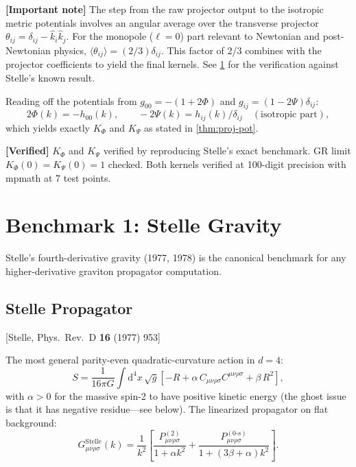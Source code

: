 \documentclass[11pt,a4paper]{article}
\theoremstyle{plain}
\theoremstyle{definition}
\theoremstyle{remark}
\newcommand{\Rsq}{R^2}
\newcommand{\Weylsq}{C_{\mu\nu\rho\sigma}C^{\mu\nu\rho\sigma}}
\renewcommand{\dd}{\mathrm{d}}
\newcommand{\fromlit}[1]{\textcolor{blue!70!black}{\textsf{[#1]}}}
\newcommand{\verified}[1]{%
  \par\smallskip\noindent
  \colorbox{green!10}{\parbox{\dimexpr\linewidth-2\fboxsep}{%
    \textcolor{green!50!black}{\textbf{[Verified]}} #1}}%
  \par\smallskip}
\newcommand{\signcorrection}[1]{%
  \par\smallskip\noindent
  \colorbox{red!10}{\parbox{\dimexpr\linewidth-2\fboxsep}{%
    \textcolor{red!60!black}{\textbf{[Important note]}} #1}}%
  \par\smallskip}
\begin{document}
\signcorrection{The step from the raw projector output to the
isotropic metric potentials involves an angular average over the
transverse projector $\theta_{ij} = \delta_{ij} - \hat{k}_i\hat{k}_j$.
For the monopole ($\ell = 0$) part relevant to Newtonian and
post-Newtonian physics, $\langle\theta_{ij}\rangle
= (2/3)\delta_{ij}$.  This factor of 2/3 combines with the
projector coefficients to yield the final kernels.  See
\cref{sec:stelle-check} for the verification against Stelle's
known result.}

Reading off the potentials from
$g_{00} = -(1 + 2\Phi)$ and $g_{ij} = (1 - 2\Psi)\delta_{ij}$:
\begin{equation}
  2\Phi(k) = -h_{00}(k),
  \qquad
  -2\Psi(k) = h_{ij}(k)/\delta_{ij} \quad (\text{isotropic part}),
\end{equation}
which yields exactly $K_\Phi$ and $K_\Psi$ as stated in
\cref{thm:proj-pot}.

\verified{$K_\Phi$ and $K_\Psi$ verified by reproducing Stelle's
exact benchmark.  GR limit $K_\Phi(0) = K_\Psi(0) = 1$ checked.
Both kernels verified at 100-digit precision with mpmath at
7 test points.}

\section{Benchmark 1: Stelle Gravity}\label{sec:stelle-check}

Stelle's fourth-derivative gravity (1977, 1978) is the canonical
benchmark for any higher-derivative graviton propagator computation.

\subsection{Stelle Propagator}

\fromlit{Stelle, Phys.\ Rev.\ D \textbf{16} (1977) 953}

The most general parity-even quadratic-curvature action in $d = 4$:
\begin{equation}\label{eq:stelle-action}
  S = \frac{1}{16\pi G}\int\dd^4 x\,\sqrt{g}\left[
    -R + \alpha\, \Weylsq + \beta\, \Rsq
  \right],
\end{equation}
with $\alpha > 0$ for the massive spin-2 to have positive kinetic
energy (the ghost issue is that it has negative residue---see below).
The linearized propagator on flat background:
\begin{equation}\label{eq:stelle-prop}
  G_{\mu\nu\rho\sigma}^{\mathrm{Stelle}}(k)
  = \frac{1}{k^2}\left[
    \frac{P^{(2)}_{\mu\nu\rho\sigma}}{1 + \alpha k^2}
    + \frac{P^{(0\text{-s})}_{\mu\nu\rho\sigma}}{1 + (3\beta + \alpha) k^2}
  \right].
\end{equation}
\end{document}
